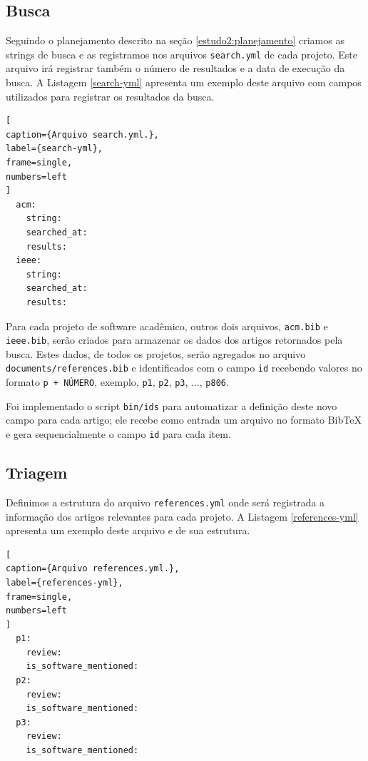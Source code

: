 
\subsection{Busca}

Seguindo o planejamento descrito na seção \ref{estudo2:planejamento} criamos as
strings de busca e as registramos nos arquivos \texttt{search.yml} de cada
projeto. Este arquivo irá registrar também o número de resultados e a data de
execução da busca. A Listagem \ref{search-yml} apresenta um exemplo deste
arquivo com campos utilizados para registrar os resultados da busca.

\begin{lstlisting}[
caption={Arquivo search.yml.},
label={search-yml},
frame=single,
numbers=left
]
  acm:
    string:
    searched_at:
    results:
  ieee:
    string:
    searched_at:
    results:
\end{lstlisting}

Para cada projeto de software acadêmico, outros dois arquivos,
\texttt{acm.bib} e \texttt{ieee.bib}, serão criados para armazenar os dados dos artigos
retornados pela busca. Estes dados, de todos os projetos, serão agregados no
arquivo \texttt{documents/references.bib} e identificados com
o campo \texttt{id} recebendo valores no formato \texttt{p + NÚMERO},
exemplo, \texttt{p1}, \texttt{p2}, \texttt{p3}, ..., \texttt{p806}.

Foi implementado o script \texttt{bin/ids} para automatizar a
definição deste novo campo para cada artigo; ele recebe como entrada um arquivo
no formato BibTeX e gera sequencialmente o campo \texttt{id} para cada item.

\subsection{Triagem}

Definimos a estrutura do arquivo \texttt{references.yml} onde será registrada a
informação dos artigos relevantes para cada projeto. A Listagem
\ref{references-yml} apresenta um exemplo deste arquivo e de sua estrutura.

\begin{lstlisting}[
caption={Arquivo references.yml.},
label={references-yml},
frame=single,
numbers=left
]
  p1:
    review:
    is_software_mentioned:
  p2:
    review:
    is_software_mentioned:
  p3:
    review:
    is_software_mentioned:
\end{lstlisting}

